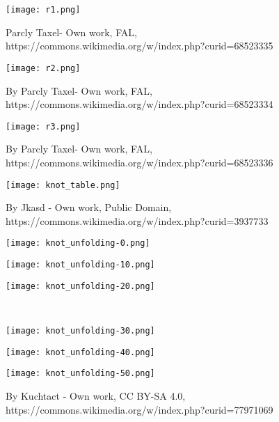 \documentclass[12pt, a4paper]{article}
\begin{document}
\begin{figure}[H]
  \centering
            \texttt{[image: r1.png]}
            \caption[]{Parcly Taxel- Own work, FAL, https://commons.wikimedia.org/w/index.php?curid=68523335}
\end{figure}
\begin{figure}[H]
             \centering
            \texttt{[image: r2.png]}
            \caption[]{By Parcly Taxel- Own work, FAL, https://commons.wikimedia.org/w/index.php?curid=68523334}
\end{figure}
\begin{figure}[H]
             \centering
            \texttt{[image: r3.png]}
            \caption[]{By Parcly Taxel- Own work, FAL, https://commons.wikimedia.org/w/index.php?curid=68523336}
\end{figure}

\begin{figure}[H]
  \centering
  \texttt{[image: knot\_table.png]}
  \caption[]{By Jkasd - Own work, Public Domain, https://commons.wikimedia.org/w/index.php?curid=3937733}
\end{figure}

\begin{figure}[H]
  \begin{minipage}[c]{.2\textwidth}
  \centering
  \texttt{[image: knot\_unfolding-0.png]}
    
  \end{minipage}
  \hfill
  \begin{minipage}[c]{.2\textwidth}
  \centering
  \texttt{[image: knot\_unfolding-10.png]}
    
  \end{minipage}
  \hfill
  \begin{minipage}[c]{.2\textwidth}
  \centering
  \texttt{[image: knot\_unfolding-20.png]}
    
  \end{minipage}\\
  \begin{minipage}[c]{.2\textwidth}
  \centering
  \texttt{[image: knot\_unfolding-30.png]}
    
  \end{minipage}
  \hfill
  \begin{minipage}[c]{.2\textwidth}
  \centering
  \texttt{[image: knot\_unfolding-40.png]}
    
  \end{minipage}
  \hfill
  \begin{minipage}[c]{.2\textwidth}
  \centering
  \texttt{[image: knot\_unfolding-50.png]}
    
  \end{minipage}
  \caption[]{By Kuchtact - Own work, CC BY-SA 4.0, https://commons.wikimedia.org/w/index.php?curid=77971069}
\end{figure}
\end{document}
